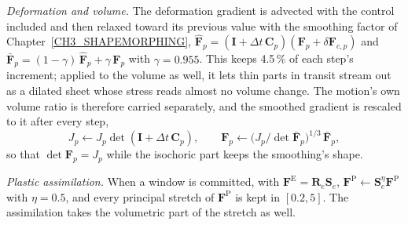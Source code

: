 \textit{Deformation and volume.} The deformation gradient is advected with the control included and then relaxed toward
its previous value with the smoothing factor of Chapter~\ref{CH3_SHAPEMORPHING},
$\hat{\mathbf{F}}_p=(\mathbf{I}+\Delta t\,\mathbf{C}_p)(\mathbf{F}_p+\delta\mathbf{F}_{c,p})$ and
$\bar{\mathbf{F}}_p=(1-\gamma)\,\hat{\mathbf{F}}_p+\gamma\,\mathbf{F}_p$ with $\gamma=0.955$. This keeps 4.5\,\% of each step's
increment; applied to the volume as well, it lets thin parts in transit stream out as a dilated sheet whose stress reads
almost no volume change. The motion's own volume ratio is therefore carried separately, and the smoothed gradient is
rescaled to it after every step,
\begin{equation}
\label{ch4:eq_volume}
J_p\leftarrow J_p\det(\mathbf{I}+\Delta t\,\mathbf{C}_p),\qquad
\mathbf{F}_p\leftarrow\big(J_p/\det\bar{\mathbf{F}}_p\big)^{1/3}\,\bar{\mathbf{F}}_p ,
\end{equation}
so that $\det\mathbf{F}_p=J_p$ while the isochoric part keeps the smoothing's shape.

\textit{Plastic assimilation.} When a window is committed, with $\mathbf{F}^{\mathrm{E}}=\mathbf{R}_e\mathbf{S}_e$,
$\mathbf{F}^{\mathrm{P}}\leftarrow\mathbf{S}_e^{\eta}\mathbf{F}^{\mathrm{P}}$ with $\eta=0.5$, and every principal stretch of
$\mathbf{F}^{\mathrm{P}}$ is kept in $[0.2,5]$. The assimilation takes the volumetric part of the stretch as well.

